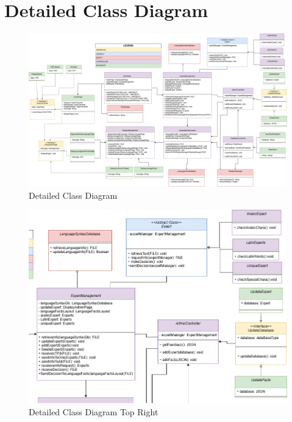 \section{Detailed Class Diagram}
\label{sec:detailed_class_diagram}

\begin{figure}[H]
	\centering
	\includegraphics[width=\textwidth, height=\textheight, keepaspectratio]{Section4/images/LangufiyClassDiagramV7.png}
	\caption{Detailed Class Diagram}
	\label{DetailedClassDiagram}
\end{figure}

\begin{figure}[H]
	\centering
	\includegraphics[width=\textwidth, height=\textheight, keepaspectratio]{Section4/images/LangufiyClassDiagramV6TR.png}
	\caption{Detailed Class Diagram Top Right}
	\label{DetailedClassDiagramQ1}
\end{figure}


